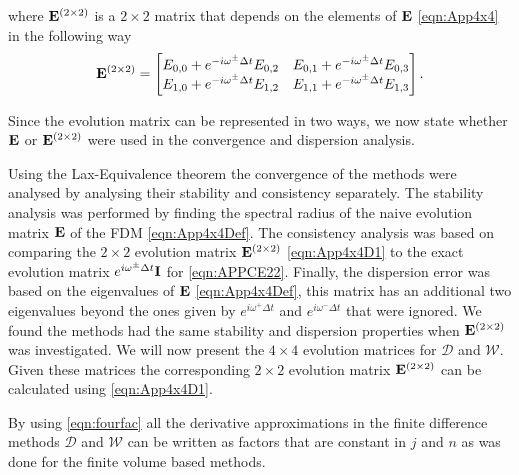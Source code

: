 where $\mathbf{E}^{\left(2 \times 2\right)}$ is a $2 \times 2$ matrix that depends on the elements of $\mathbf{E}$ \eqref{eqn:App4x4} in the following way
\begin{equation}
\label{eqn:App4x4D1}
\mathbf{E}^{\left(2 \times 2\right)} = \begin{bmatrix}E_{0,0} + e^{-i \omega^{\pm }\Delta t} E_{0,2} & E_{0,1} + e^{-i \omega^{\pm }\Delta t} E_{0,3} \\
E_{1,0} + e^{-i \omega^{\pm }\Delta t} E_{1,2} & E_{1,1} + e^{-i \omega^{\pm }\Delta t} E_{1,3} \\
\end{bmatrix}.
\end{equation}

Since the evolution matrix can be represented in two ways, we now state whether $\mathbf{E}$ or $\mathbf{E}^{\left(2 \times 2\right)}$ were used in the convergence and dispersion analysis.   

Using the Lax-Equivalence theorem the convergence of the methods were analysed by analysing their stability and consistency separately. The stability analysis was performed by finding the spectral radius of the naive evolution matrix $\mathbf{E}$ of the FDM \eqref{eqn:App4x4Def}. The consistency analysis was based on comparing the $2\times2$ evolution matrix $\mathbf{E}^{\left(2 \times 2\right)}$ \eqref{eqn:App4x4D1} to the exact evolution matrix $e^{i \omega^\pm \Delta t}\mathbf{I} $ for \eqref{eqn:APPCE22}. Finally, the dispersion error was based on the eigenvalues of $\mathbf{E}$ \eqref{eqn:App4x4Def}, this matrix has an additional two eigenvalues beyond the ones given by $e^{i \omega^+ \Delta t}$ and $e^{i \omega^- \Delta t}$ that were ignored. We found the methods had the same stability and dispersion properties when $\mathbf{E}^{\left(2 \times 2\right)}$ was investigated. We will now present the $4\times4$ evolution matrices for $\mathcal{D}$ and $\mathcal{W}$. Given these matrices the corresponding $2\times 2$ evolution matrix $\mathbf{E}^{\left(2 \times 2\right)}$ can be calculated using \eqref{eqn:App4x4D1}.



By using \eqref{eqn:fourfac} all the derivative approximations in the finite difference methods $\mathcal{D}$ and $\mathcal{W}$ can be written as factors that are constant in $j$ and $n$ as was done for the finite volume based methods.

